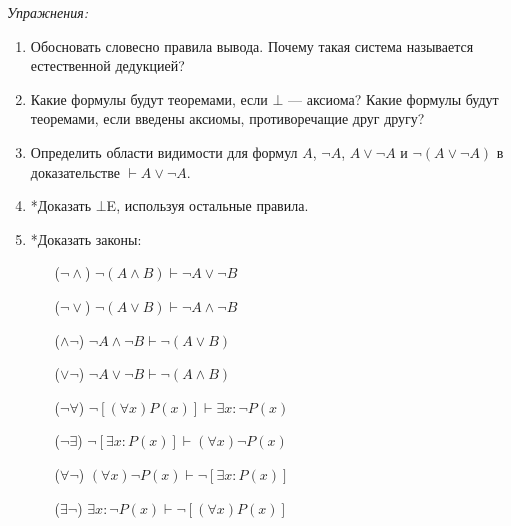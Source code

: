 {\it Упражнения:}
\begin{enumerate}
	\item{}Обосновать словесно правила вывода. Почему такая система называется
	естественной дедукцией?
	\item{}Какие формулы будут теоремами, если $\bot$ --- аксиома?
	Какие формулы будут теоремами, если введены аксиомы, противоречащие
	друг другу?
	\item{}Определить области видимости для формул $A$, $\lnot A$, $A\lor\lnot A$
	и $\lnot(A\lor\lnot A)$ в доказательстве $\vdash A\lor\lnot A$.
	\item{}*Доказать $\bot$E, используя остальные правила.\label{ex:be_proof}
	\pagebreak
	\item{}*Доказать законы:\label{ex:neg_rules_proof}
	\begin{multicols}{2}
		\begin{enumerate}
			\item[($\lnot\land$)]{}$\lnot(A\land B)\vdash \lnot A\lor \lnot B$
			\item[($\lnot\lor$)]{}$\lnot(A\lor B)\vdash \lnot A\land \lnot B$
			\item[($\land\lnot$)]{}$\lnot A\land\lnot B\vdash \lnot(A\lor B)$
			\item[($\lor\lnot$)]{}$\lnot A\lor\lnot B\vdash \lnot(A\land B)$
			\item[($\lnot\forall$)]{}$\lnot[(\forall x)P(x)]\vdash\exists x:\lnot P(x)$
			\item[($\lnot\exists$)]{}$\lnot[\exists x:P(x)]\vdash (\forall x)\lnot P(x)$
			\item[($\forall\lnot$)]{}$(\forall x)\lnot P(x)\vdash \lnot[\exists x:P(x)]$
			\item[($\exists\lnot$)]{}$\exists x:\lnot P(x)\vdash \lnot[(\forall x)P(x)]$
		\end{enumerate}
	\end{multicols}
\end{enumerate}

